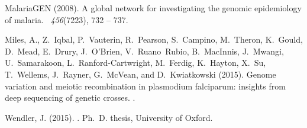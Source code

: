 \begin{figure}
\begin{center}
\end{center}
\end{figure}

\begin{figure}
\begin{center}
\end{center}
\end{figure}




\begin{thebibliography}{}

MalariaGEN (2008).
\newblock A global network for investigating the genomic epidemiology of
  malaria.
~{\em 456\/}(7223), 732 -- 737.

Miles, A., Z.~Iqbal, P.~Vauterin, R.~Pearson, S.~Campino, M.~Theron, K.~Gould,
  D.~Mead, E.~Drury, J.~O{\textquoteright}Brien, V.~Ruano~Rubio, B.~MacInnis,
  J.~Mwangi, U.~Samarakoon, L.~Ranford-Cartwright, M.~Ferdig, K.~Hayton, X.~Su,
  T.~Wellems, J.~Rayner, G.~McVean, and D.~Kwiatkowski (2015).
\newblock Genome variation and meiotic recombination in plasmodium falciparum:
  insights from deep sequencing of genetic crosses.
.

Wendler, J. (2015).
.
\newblock Ph.\ D. thesis, University of Oxford.

\end{thebibliography}
